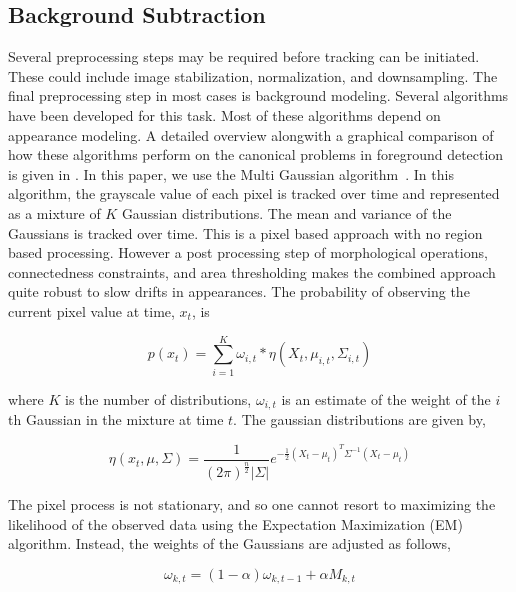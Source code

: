 \documentclass{article}
\begin{document}
\subsection{Background Subtraction}
Several preprocessing steps may be required before tracking can be initiated.  These could include image stabilization, normalization, and downsampling.  The final preprocessing step in most cases is background modeling.  Several algorithms have been developed for this task.  Most of these algorithms depend on appearance modeling.  A detailed overview alongwith a graphical comparison of how these algorithms perform on the canonical problems in foreground detection is given in \cite{1999_CNF_Wallflower_Toyama}.  In this paper, we use the Multi Gaussian algorithm~\cite{2000_JNL_MG_Stauffer}.  In this algorithm, the grayscale value of each pixel is tracked over time and represented as a mixture of $K$ Gaussian distributions.  The mean and variance of the Gaussians is tracked over time.  This is a pixel based approach with no region based processing.  However a post processing step of morphological operations, connectedness constraints, and area thresholding makes the combined approach quite robust to slow drifts in appearances.  The probability of observing the current pixel value at time, $x_t$, is 

\begin{equation}
p(x_t)=\sum_{i=1}^{K}\omega_{i,t}*\eta(X_t, \mu_{i,t}, \Sigma_{i,t})
\end{equation}

where $K$ is the number of distributions,  $\omega_{i,t}$ is an estimate of the weight of the $i$th Gaussian in the mixture at time $t$.  The gaussian distributions are given by,

\begin{equation}
\eta(x_t, \mu, \Sigma)=\frac{1}{(2\pi)^\frac{n}{2}|\Sigma|}e^{-\frac{1}{2}(X_t-\mu_t)^T\Sigma^{-1}(X_t-\mu_t)}
\end{equation}

  The pixel process is not stationary, and so one cannot resort to maximizing the likelihood of the observed data using the Expectation Maximization (EM) algorithm.  Instead, the weights of the Gaussians are adjusted as follows,

\begin{equation}
\omega_{k,t} = (1-\alpha) \omega_{k,t-1} + \alpha M_{k,t}
\end{equation}
\end{document}
